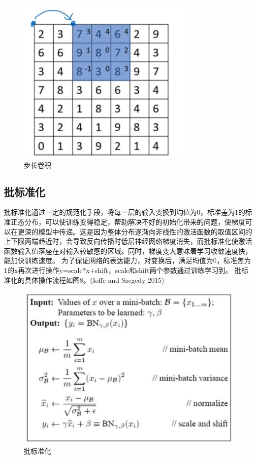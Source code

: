 \documentclass[hyperref, a4paper]{ctexart}
\begin{document}
\begin{figure}
\centering
\includegraphics{./7.png}
\caption{步长卷积}
\end{figure}

\hypertarget{ux6279ux6807ux51c6ux5316}{%
\subsection{批标准化}\label{ux6279ux6807ux51c6ux5316}}

批标准化通过一定的规范化手段，将每一层的输入变换到均值为0，标准差为1的标准正态分布，可以使训练变得稳定，帮助解决不好的初始化带来的问题，使梯度可以在更深的模型中传递。这是因为整体分布逐渐向非线性的激活函数的取值区间的上下限两端趋近时，会导致反向传播时低层神经网络梯度消失，而批标准化使激活函数输入值落座在对输入较敏感的区域。同时，梯度变大意味着学习收敛速度快，能加快训练速度。
为了保证网络的表达能力，对变换后，满足均值为0，标准差为1的x再次进行操作y=scale*x+shift，scale和shift两个参数通过训练学习到。
批标准化的具体操作流程如图8。(Ioffe and Szegedy 2015)

\begin{figure}
\centering
\includegraphics{./8.png}
\caption{批标准化}
\end{figure}
\end{document}
